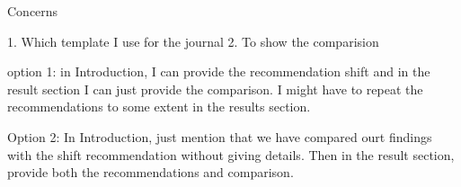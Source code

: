 Concerns

1. Which template I use for the journal
2. To show the comparision

option 1: in Introduction, I can provide the recommendation shift and in the result section I can just provide the comparison. I might have to repeat the recommendations to some extent in the results section.

Option 2: In Introduction, just mention that we have compared ourt findings with the shift recommendation without giving details. Then in the result section, provide both the recommendations and comparison.